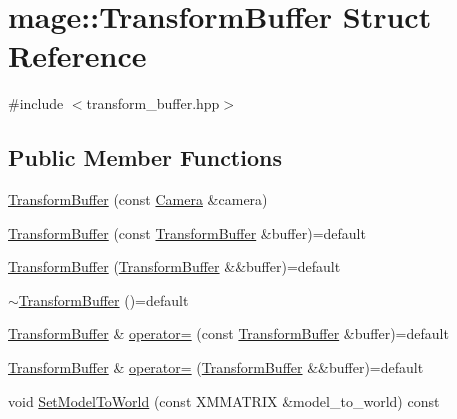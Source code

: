 \hypertarget{structmage_1_1_transform_buffer}{}\section{mage\+:\+:Transform\+Buffer Struct Reference}
\label{structmage_1_1_transform_buffer}


{\ttfamily \#include $<$transform\+\_\+buffer.\+hpp$>$}

\subsection*{Public Member Functions}
\begin{DoxyCompactItemize}
\item 
\hyperlink{structmage_1_1_transform_buffer_a9a627fb63533073b2c699136e04dae14}{Transform\+Buffer} (const \hyperlink{classmage_1_1_camera}{Camera} \&camera)
\item 
\hyperlink{structmage_1_1_transform_buffer_a1ede694450450cc6b13a5caed373abad}{Transform\+Buffer} (const \hyperlink{structmage_1_1_transform_buffer}{Transform\+Buffer} \&buffer)=default
\item 
\hyperlink{structmage_1_1_transform_buffer_a6bba9485596567f70f8ef7b8d4a913a7}{Transform\+Buffer} (\hyperlink{structmage_1_1_transform_buffer}{Transform\+Buffer} \&\&buffer)=default
\item 
\hyperlink{structmage_1_1_transform_buffer_aac881d64eb39634d0e0e6cd8a13b6e2a}{$\sim$\+Transform\+Buffer} ()=default
\item 
\hyperlink{structmage_1_1_transform_buffer}{Transform\+Buffer} \& \hyperlink{structmage_1_1_transform_buffer_a5268ed4c7f416a54976f7ad18a1cb108}{operator=} (const \hyperlink{structmage_1_1_transform_buffer}{Transform\+Buffer} \&buffer)=default
\item 
\hyperlink{structmage_1_1_transform_buffer}{Transform\+Buffer} \& \hyperlink{structmage_1_1_transform_buffer_a9fb3da35649fe9d023a061ad707fc0fc}{operator=} (\hyperlink{structmage_1_1_transform_buffer}{Transform\+Buffer} \&\&buffer)=default
\item 
void \hyperlink{structmage_1_1_transform_buffer_ab9d62cf4fc2332242333b4649779e706}{Set\+Model\+To\+World} (const X\+M\+M\+A\+T\+R\+IX \&model\+\_\+to\+\_\+world) const
\end{DoxyCompactItemize}
